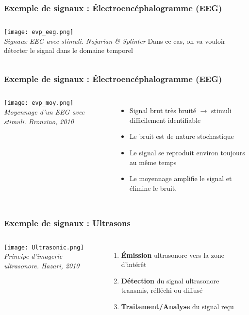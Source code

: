 \documentclass{beamer}
\begin{document}
\begin{frame}
\frametitle{Exemple de signaux : \'Electroencéphalogramme (EEG)}
\begin{columns}
\column{60mm}
\texttt{[image: evp\_eeg.png]}\\
\textit{\footnotesize Signaux EEG avec stimuli. Najarian \& Splinter}
\column{60mm}
Dans ce cas, on va vouloir détecter le signal dans le domaine temporel
\end{columns}

\end{frame}

\begin{frame}
\frametitle{Exemple de signaux : \'Electroencéphalogramme (EEG)}
\begin{columns}
\column{60mm}
\texttt{[image: evp\_moy.png]}\\
\textit{\footnotesize Moyennage d'un EEG avec stimuli. Bronzino, 2010}
\column{60mm}
\begin{itemize}
\item Signal brut très bruité $\rightarrow$ stimuli difficilement identifiable
\vspace{0.2cm}
\item Le bruit est de nature stochastique 
\vspace{0.2cm}
\item Le signal se reproduit environ toujours au même temps
\vspace{0.2cm}
\item Le moyennage amplifie le signal et élimine le bruit.
\end{itemize}
\end{columns}

\end{frame}

\begin{frame}
\frametitle{Exemple de signaux : Ultrasons}
\begin{columns}
\column{60mm}
\texttt{[image: Ultrasonic.png]}\\
\textit{\footnotesize Principe d'imagerie ultrasonore. Hazari, 2010}
\column{60mm}
\begin{enumerate}
\item<2-> \textbf{\'Emission} ultrasonore vers la zone d'intérêt
\vspace{0.2cm}
\item<3-> \textbf{Détection} du signal ultrasonore transmis, réfléchi ou diffusé
\vspace{0.2cm}
\item<4-> \textbf{Traitement/Analyse} du signal reçu
\end{enumerate}
\end{columns}
\end{frame}
\end{document}

